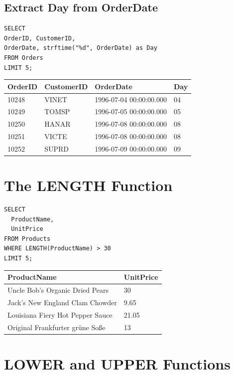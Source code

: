 \documentclass[10pt]{article}
\begin{document}
\subsection{Extract Day from OrderDate}

\begin{verbatim}
SELECT 
OrderID, CustomerID, 
OrderDate, strftime("%d", OrderDate) as Day
FROM Orders
LIMIT 5;
\end{verbatim}

\begin{table}[H]
\begin{tabular}{|l|l|l|l|}
\hline
OrderID	& CustomerID	& OrderDate	& Day \\
\hline
10248	& VINET	& 1996-07-04 00:00:00.000	& 04 \\
10249	& TOMSP	& 1996-07-05 00:00:00.000	& 05 \\
10250	& HANAR	& 1996-07-08 00:00:00.000	& 08 \\
10251	& VICTE	& 1996-07-08 00:00:00.000	& 08 \\
10252	& SUPRD	& 1996-07-09 00:00:00.000	& 09 \\
\hline
\end{tabular}
\end{table}


\section{The LENGTH Function}

\begin{verbatim}
SELECT 
  ProductName, 
  UnitPrice
FROM Products
WHERE LENGTH(ProductName) > 30 
LIMIT 5;
\end{verbatim}


\begin{table}[H]
\begin{tabular}{|l|l|}
\hline
ProductName	& UnitPrice \\
\hline
Uncle Bob's Organic Dried Pears	& 30 \\
Jack's New England Clam Chowder	& 9.65 \\
Louisiana Fiery Hot Pepper Sauce	& 21.05 \\
Original Frankfurter grüne Soße	& 13 \\
\hline
\end{tabular}
\end{table} 


\section{LOWER and UPPER Functions}
\end{document}
